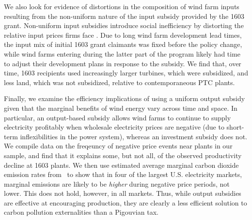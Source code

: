 \documentclass[12pt]{article}
\begin{document}
We also look for evidence of distortions in the composition of wind farm inputs resulting from the non-uniform nature of the input subsidy provided by the 1603 grant. Non-uniform input subsidies introduce social inefficiency by distorting the relative input prices firms face \citep{goolsbee_taxes_2004}. Due to long wind farm development lead times, the input mix of initial 1603 grant claimants was fixed before the policy change, while wind farms entering during the latter part of the program likely had time to adjust their development plans in response to the subsidy. We find that, over time, 1603 recipients used increasingly larger turbines, which were subsidized, and less land, which was not subsidized, relative to contemporaneous PTC plants.

Finally, we examine the efficiency implications of using a uniform output subsidy given that the marginal benefits of wind energy vary across time and space. In particular, an output-based subsidy allows wind farms to continue to supply electricity profitably when wholesale electricity prices are negative (due to short-term inflexibilities in the power system), whereas an investment subsidy does not. We compile data on the freqeuncy of negative price events near plants in our sample, and find that it explains some, but not all, of the observed productivity decline at 1603 plants. We then use estimated average marginal carbon dioxide emission rates from~\citet{callaway_location_2018} to show that in four of the largest U.S. electricity markets, marginal emissions are likely to be \emph{higher} during negative price periods, not lower. This does not hold, however, in all markets. Thus, while output subsidies are effective at encouraging production, they are clearly a less efficient solution to carbon pollution externalities than a Pigouvian tax.
\end{document}
